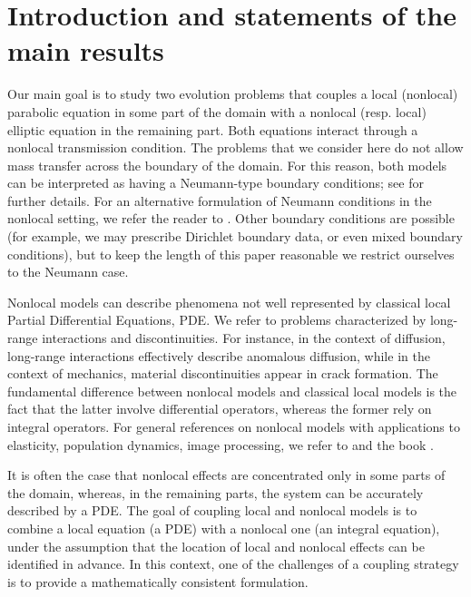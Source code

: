 \documentclass[reqno]{amsart}
\numberwithin{equation}{section}
\begin{document}
\maketitle
\allowdisplaybreaks
\tableofcontents

\section{Introduction and statements of the main results}

Our main goal is to study two evolution problems that couples a local (nonlocal) parabolic equation in some part of the domain with a nonlocal (resp. local) elliptic equation in the remaining part. Both equations interact through a nonlocal transmission condition. 
The problems that we consider here do not allow mass transfer across the boundary of the domain. 
For this reason, both models can be interpreted as having a Neumann-type boundary
conditions; see \cite{julio, acosta} for further details. For an alternative formulation of Neumann conditions in the nonlocal setting, we refer the reader to \cite{toninho}. 
Other boundary conditions are possible (for example, we may prescribe Dirichlet boundary data, or even mixed boundary conditions),
but to keep the length of this paper reasonable we restrict ourselves to the Neumann case.


Nonlocal models can describe phenomena
not well represented by classical local Partial Differential Equations, PDE.
We refer to problems characterized by long-range interactions and discontinuities. 
For instance, in the context of diffusion, long-range interactions effectively
describe anomalous diffusion, while in the context of mechanics, material discontinuities
appear in crack formation. 
The fundamental difference between nonlocal models and classical local models  
is the fact that the latter involve differential operators, whereas the
former rely on integral operators. For general references on nonlocal models 
with applications to elasticity, population dynamics, image processing, we refer
to \citet{acosta,BatesChmaj99,BatesFifeRenWang97,BrandleChasseigneQuiros12,
CanizoMolino18,CarrilloFife05,ChasseigneChavesRossi06,
CortazarElguetaRossiWolanski07,CortazarElguetaRossiWolanski08,cortazar,
Coville,DiPaola,Fife03,Hutson,MenDu} and the book \citet{julio}.

It is often the case that nonlocal effects are concentrated only in
some parts of the domain, whereas, in the remaining parts, the system can be accurately
described by a PDE. The goal of coupling local and nonlocal models is to
combine a local equation (a PDE) with a nonlocal one (an integral equation),
under the assumption that the location of local and nonlocal effects can be identified
in advance. 
In this
context, one of the challenges of a coupling strategy is to provide a mathematically 
consistent formulation.
 
\end{document}

